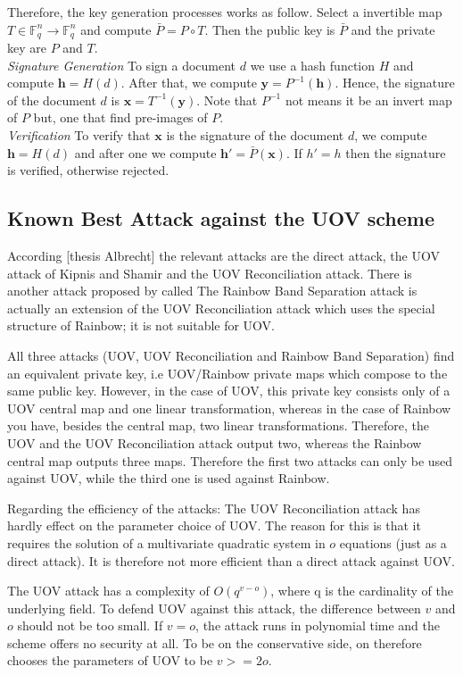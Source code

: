Therefore, the key generation processes works as follow. Select a invertible map $T\in \mathbb{F}_q^n\rightarrow \mathbb{F}_q^n$ and compute $\bar{P} = P \circ T$. Then the public key is $\bar{P}$ and the private key are $P$ and $T$.\\
\noindent
\textit{Signature Generation} To sign a document $d$ we use a hash function $H$ and compute $\boldsymbol h=H(d)$. After that, we compute $\boldsymbol y = P^{-1}(\boldsymbol h)$. Hence, the signature of the document $d$ is $\boldsymbol x = T^{-1}(\boldsymbol y)$. Note that $P^{-1}$ not means it be an invert map of $P$ but, one that find pre-images of $P$.\\
\noindent
\textit{Verification}
To verify that $\boldsymbol x$ is the signature of the document $d$, we compute $\boldsymbol h=H(d)$ and after one we compute $\boldsymbol h' = \bar{P}(\boldsymbol x)$. If $h' = h$ then the signature is verified, otherwise rejected.
\subsection{Known Best Attack against the UOV scheme}
According [thesis Albrecht] the  relevant attacks are the direct attack, the UOV attack of Kipnis and Shamir and the UOV Reconciliation attack. There is another attack proposed by called The Rainbow Band Separation attack is actually an extension of the UOV Reconciliation attack which uses the special structure of Rainbow; it is not suitable for UOV.

All three attacks (UOV, UOV Reconciliation and Rainbow Band Separation) find an equivalent private key, i.e  UOV/Rainbow private maps which compose to the same public key. However, in the case of UOV, this private key consists only of a UOV central map and one linear transformation, whereas in the case of Rainbow you have, besides the central map, two linear transformations. Therefore, the UOV and the UOV Reconciliation attack output two, whereas the Rainbow central map outputs three maps. Therefore the first two attacks can only be used against UOV, while the third one is used against Rainbow. 

Regarding the efficiency of the attacks: The UOV Reconciliation attack has hardly effect on the parameter choice of UOV. The reason for this is that it requires the solution of a multivariate quadratic system in $o$ equations (just as a direct attack). It is therefore not more efficient than a direct attack against UOV.

The UOV attack has a complexity of $O(q^{v-o})$, where q is the cardinality of the underlying field. To defend UOV against this attack, the difference between $v$ and $o$ should not be too small. If $v=o$, the attack runs in polynomial time and the scheme offers no security at all. To be on the conservative side, on therefore chooses the parameters of UOV to be $v >= 2o$.

